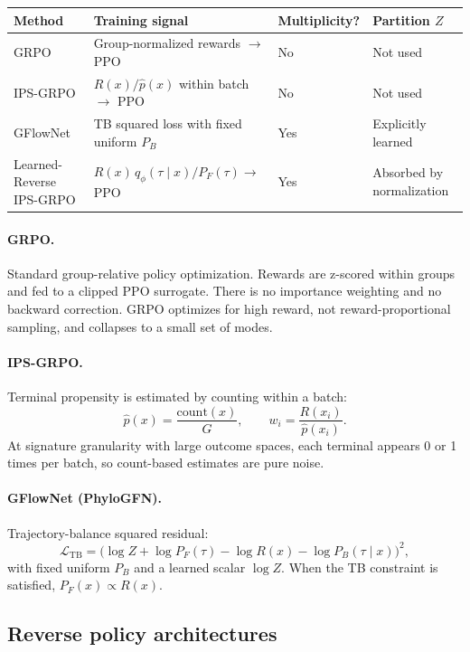 \documentclass[11pt]{article}
\newcommand{\PF}{P_F}
\newcommand{\PB}{P_B}
\newcommand{\R}{R}
\begin{document}
\begin{center}
\begin{tabular}{@{}llll@{}}
\toprule
Method & Training signal & Multiplicity? & Partition \(Z\) \\
\midrule
GRPO & Group-normalized rewards \(\rightarrow\) PPO & No & Not used \\
IPS-GRPO & \(R(x)/\hat{p}(x)\) within batch \(\rightarrow\) PPO & No & Not used \\
GFlowNet & TB squared loss with fixed uniform \(\PB\) & Yes & Explicitly learned \\
Learned-Reverse IPS-GRPO & \(R(x)\,q_\phi(\tau\mid x)/P_F(\tau)\rightarrow\) PPO & Yes & Absorbed by normalization \\
\bottomrule
\end{tabular}
\end{center}

\paragraph{GRPO.}
Standard group-relative policy optimization. Rewards are z-scored within groups and fed to a clipped PPO surrogate. There is no importance weighting and no backward correction. GRPO optimizes for high reward, not reward-proportional sampling, and collapses to a small set of modes.

\paragraph{IPS-GRPO.}
Terminal propensity is estimated by counting within a batch:
\[
\hat{p}(x)=\frac{\mathrm{count}(x)}{G},
\qquad
w_i=\frac{\R(x_i)}{\hat{p}(x_i)}.
\]
At signature granularity with large outcome spaces, each terminal appears 0 or 1 times per batch, so count-based estimates are pure noise.

\paragraph{GFlowNet (PhyloGFN).}
Trajectory-balance squared residual:
\[
\mathcal{L}_{\mathrm{TB}}
=
\bigl(\log Z + \log \PF(\tau) - \log \R(x) - \log \PB(\tau\mid x)\bigr)^2,
\]
with fixed uniform \(\PB\) and a learned scalar \(\log Z\). When the TB constraint is satisfied, \(\PF(x)\propto \R(x)\).

\subsection{Reverse policy architectures}
\end{document}
